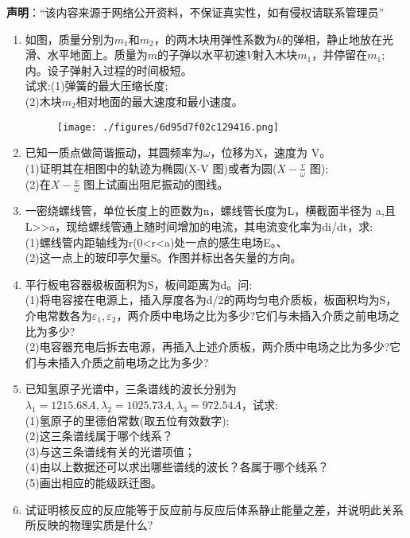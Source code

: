 
\textbf{声明}：“该内容来源于网络公开资料，不保证真实性，如有侵权请联系管理员”
\begin{enumerate}
\item 如图，质量分别为$m_1$和$m_2$，的两木块用弹性系数为$k$的弹相，静止地放在光滑、水平地面上。质量为$m$的子弹以水平初速$V$射入木块$m_1$，并停留在$m_1$;内。设子弹射入过程的时间极短。\\
试求:(1)弹簧的最大压缩长度;\\
(2)木块$m_2$相对地面的最大速度和最小速度。
\begin{figure}[ht]
\centering
\texttt{[image: ./figures/6d95d7f02c129416.png]}
\caption{} \label{fig_SSD02_1}
\end{figure}
\item  已知一质点做简谐振动，其圆频率为$\omega$，位移为X，速度为 V。\\
(1)证明其在相图中的轨迹为椭圆(X-V 图)或者为圆($\displaystyle X-\frac{v}{\omega}$ 图);\\
(2)在$\displaystyle X-\frac{v}{\omega}$ 图上试画出阻尼振动的图线。
\item 一密绕螺线管，单位长度上的匝数为n，螺线管长度为L，横截面半径为 a,且L>>a，现给螺线管通上随时间增加的电流，其电流变化率为di/dt，求:\\
(1)螺线管内距轴线为r(0<r<a)处一点的感生电场E。、\\
(2)这一点上的玻印亭欠量S。作图并标出各矢量的方向。
\item 平行板电容器极板面积为S，板间距离为d。问:\\
(1)将电容接在电源上，插入厚度各为d/2的两均匀电介质板，板面积均为S，介电常数各为$\varepsilon_1,\varepsilon_2$，两介质中电场之比为多少?它们与未插入介质之前电场之比为多少?\\
(2)电容器充电后拆去电源，再插入上述介质板，两介质中电场之比为多少?它们与未插入介质之前电场之比为多少?
\item 已知氢原子光谱中，三条谱线的波长分别为$\lambda_1=1215.68A,\lambda_2=1025.73A,\lambda_3=972.54A$，试求:\\
(1)氢原子的里德伯常数(取五位有效数字);\\
(2)这三条谱线属于哪个线系？\\
(3)与这三条谱线有关的光谱项值；\\
(4)由以上数据还可以求出哪些谱线的波长？各属于哪个线系？\\
(5)画出相应的能级跃迁图。
\item 试证明核反应的反应能等于反应前与反应后体系静止能量之差，并说明此关系所反映的物理实质是什么?
\end{enumerate}